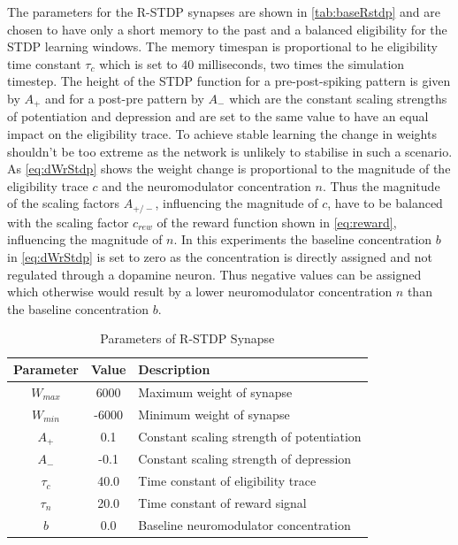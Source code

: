The parameters for the R-STDP synapses are shown in \autoref{tab:baseRstdp} and are chosen to have only a short memory to the past and a balanced eligibility for the STDP learning windows. The memory timespan is proportional to he eligibility time constant $\tau_c$ which is set to $40$ milliseconds, two times the simulation timestep. The height of the STDP function for a pre-post-spiking pattern is given by $A_+$ and for a post-pre pattern by $A_-$ which are the constant scaling strengths of potentiation and depression and are set to the same value to have an equal impact on the eligibility trace. To achieve stable learning the change in weights shouldn’t be too extreme as the network is unlikely to stabilise in such a scenario. As \autoref{eq:dWrStdp} shows the weight change is proportional to the magnitude of the eligibility trace $c$ and the neuromodulator concentration $n$. Thus the magnitude of the scaling factors $A_{+/-}$, influencing the magnitude of $c$,  have to be balanced with the scaling factor $c_{rew}$ of the reward function shown in \autoref{eq:reward}, influencing the magnitude of $n$. In this experiments the baseline concentration $b$ in \autoref{eq:dWrStdp} is set to zero as the concentration is directly assigned and not regulated through a dopamine neuron. Thus negative values can be assigned which otherwise would result by a lower neuromodulator concentration $n$ than the baseline concentration $b$.

\begin{table}[htpb]
  \caption[Parameters R-STDP synapse]{Parameters of R-STDP Synapse} \label{tab:baseRstdp}
  \centering
  \begin{tabular}{|c| c |l|}
      \toprule
      Parameter & Value & Description \\
      \midrule
      $W_{max}$ & 6000   & Maximum weight of synapse\\   
      $W_{min}$ & -6000  & Minimum weight of synapse\\   
      $A_{+}$   & 0.1    & Constant scaling strength of potentiation\\   
      $A_{-}$   & -0.1   & Constant scaling strength of depression \\   
      $\tau_c$  & 40.0   & Time constant of eligibility trace \\  
      $\tau_n$  & 20.0   & Time constant of reward signal  \\   
      $b$       & 0.0    & Baseline neuromodulator concentration \\    
      \bottomrule
  \end{tabular}
  \end{table}


